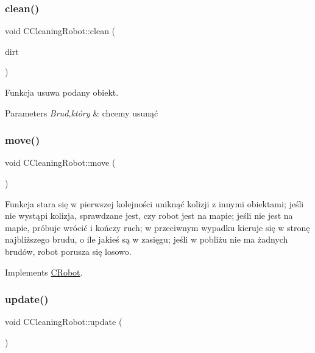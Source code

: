 \subsubsection{\texorpdfstring{clean()}{clean()}}
{\footnotesize\ttfamily void C\+Cleaning\+Robot\+::clean (\begin{DoxyParamCaption}\item[{\mbox{\hyperlink{class_c_dirt}{C\+Dirt}} $\ast$}]{dirt }\end{DoxyParamCaption})}



Funkcja usuwa podany obiekt. 


\begin{DoxyParams}{Parameters}
{\em Brud,który} & chcemy usunąć \\
\hline
\end{DoxyParams}
\mbox{\label{class_c_cleaning_robot_a1ad227a5f3508a8e78fcecae7d3de53b}} 
\subsubsection{\texorpdfstring{move()}{move()}}
{\footnotesize\ttfamily void C\+Cleaning\+Robot\+::move (\begin{DoxyParamCaption}{ }\end{DoxyParamCaption})\hspace{0.3cm}{\ttfamily [virtual]}}



Funkcja stara się w pierwszej kolejności uniknąć kolizji z innymi obiektami; jeśli nie wystąpi kolizja, sprawdzane jest, czy robot jest na mapie; jeśli nie jest na mapie, próbuje wrócić i kończy ruch; w przeciwnym wypadku kieruje się w stronę najbliższego brudu, o ile jakieś są w zasięgu; jeśli w pobliżu nie ma żadnych brudów, robot porusza się losowo. 



Implements \mbox{\hyperlink{class_c_robot_a1de9be879213eadf7ded27caedb84598}{C\+Robot}}.

\mbox{\label{class_c_cleaning_robot_afd8b3a58abfc91ebdce32af3686c5e9f}} 
\subsubsection{\texorpdfstring{update()}{update()}}
{\footnotesize\ttfamily void C\+Cleaning\+Robot\+::update (\begin{DoxyParamCaption}{ }\end{DoxyParamCaption})\hspace{0.3cm}{\ttfamily [virtual]}}



